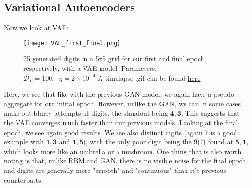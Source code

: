 \documentclass{article}
\begin{document}
\subsection{Variational Autoencoders}
Now we look at VAE:
\begin{figure}[ht!]
    \centering
    \texttt{[image: VAE\_first\_final.png]}
    \caption{25 generated digits in a 5x5 grid for our first and final epoch, respectively, with a VAE model. \newline
    Parameters: $\mathcal{D}_{L} = 100, \; \; \eta = 2\times10^{-4}$
    \newline 
    A timelapse .gif can be found \href{https://github.com/simloken/Generative_Imaging/blob/main/Figures/VAE_evolution.gif}{here}}
    \label{figVAE}
\end{figure}
\newline
Here, we see that like with the previous GAN model, we again have a pseudo-aggregate for our initial epoch. However, unlike the GAN, we can in some cases make out blurry attempts at digits, the standout being $\mathbf{4, 3}$. This suggests that the VAE converges much faster than our previous models. Looking at the final epoch, we see again good results. We see also distinct digits (again 7 is a good example with $\mathbf{1,3}$ and $\mathbf{1,5}$), with the only poor digit being the 9(?) found at $\mathbf{5,1}$, which looks more like an umbrella or a mushroom.
\newline
One thing that is also worth noting is that, unlike RBM and GAN, there is no visible noise for the final epoch, and digits are generally more "smooth" and "continuous" than it's previous counterparts.
\newpage
\end{document}
